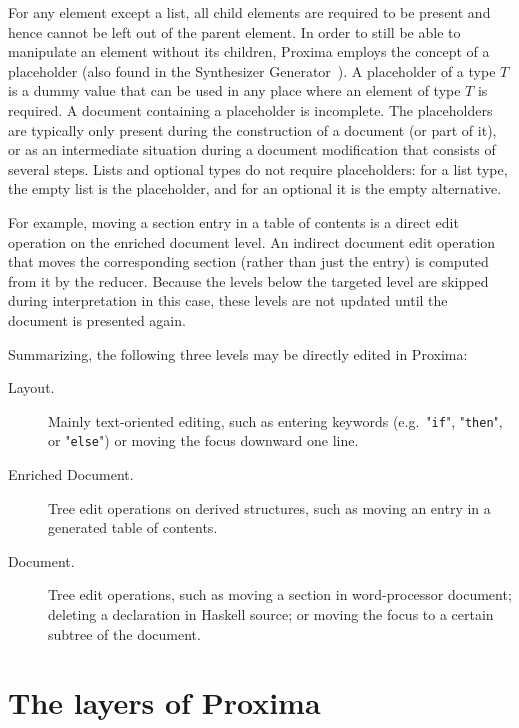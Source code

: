 \documentclass{speauth}
\begin{document}
For any element except a list, all child elements are required to be present and hence cannot be left out of the parent element. In order to still be able to manipulate an element without its children, Proxima employs the concept of a placeholder (also found in the Synthesizer Generator~\cite{reps84synGen}). A placeholder of a type $T$ is a dummy value that can be used in any place where an element of type $T$ is required. A document containing a placeholder is incomplete. The placeholders are typically only present during the construction of a document (or part of it), or as an intermediate situation during a document modification that consists of several steps. Lists and optional types do not require placeholders: for a list type, the empty list is the placeholder, and for an optional it is the empty alternative.

\bc %
For example, moving a section entry in a table of contents is a direct edit operation on the enriched document level. An indirect document edit operation that moves the corresponding section (rather than just the entry) is computed from it by the reducer. Because the levels below the targeted level are skipped during interpretation in this case, these levels are not updated until the document is presented again.  \ec

\bigskip

Summarizing, the following three levels may be directly edited in Proxima:

\begin{description}
\item[Layout.] Mainly text-oriented editing, such as entering keywords (e.g.\ "\verb|if|", "\verb|then|", or "\verb|else|") or moving the focus downward one line.
\item[Enriched Document.] Tree edit operations on derived structures, such as moving an entry in a generated table of contents.
\item[Document.] Tree edit operations, such as moving a section in word-processor document; deleting a declaration in Haskell source; or moving the focus to a certain subtree of the document.
\end{description}






%																
%																
%																
\section{The layers of Proxima} \label{sect:archProximaLayers}
\end{document}
